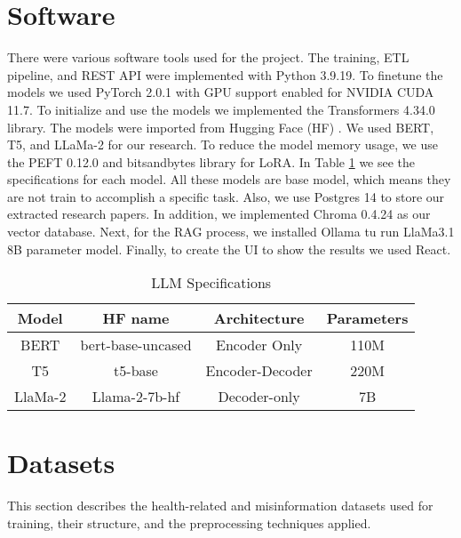 \section{Software}
There were various software tools used for the project. The training, ETL pipeline,
and REST API were implemented with Python 3.9.19. To finetune the models we used PyTorch 2.0.1 with GPU support enabled for
NVIDIA CUDA 11.7. To initialize and use the models we implemented the Transformers 4.34.0 library. The models were imported from
Hugging Face (HF) \cite{huggingface}. We used BERT, T5, and LLaMa-2 for our research. To reduce the model memory usage, we use
the PEFT 0.12.0 and bitsandbytes library for LoRA. In Table \ref{table:LLM} we see the specifications for each model. All these models are base
model, which means they are not train to accomplish a specific task. Also, we use Postgres 14 to store our extracted research papers. In addition, we
implemented Chroma 0.4.24 as our vector database. Next, for the RAG process, we installed Ollama \cite{ollama} tu run LlaMa3.1 8B
\cite{touvron2023llamaopenefficientfoundation} parameter model. Finally, to create the UI to show the results we used React.


  \begin{table}[ht!]
\centering
\caption{LLM Specifications}
\begin{tabular}{||c | c | c | c||} 
 \hline
\textbf{Model} & \textbf{HF name} & \textbf{Architecture} & \textbf{Parameters} \\ [0.5ex] 
 \hline
 BERT & bert-base-uncased & Encoder Only & 110M \\ 
 \hline
 T5 & t5-base & Encoder-Decoder & 220M \\
 \hline
 LlaMa-2 & Llama-2-7b-hf & Decoder-only & 7B \\
 \hline
\end{tabular}
\label{table:LLM}
\end{table}
 


\section{Datasets}

This section describes the health-related and misinformation datasets used for training, their structure, and the preprocessing techniques applied.

